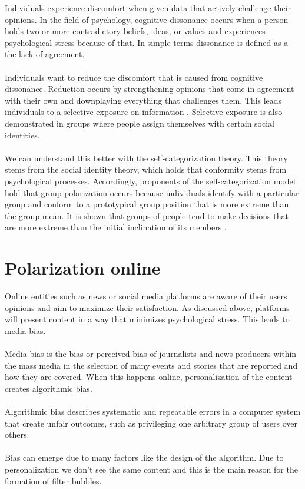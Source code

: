 Individuals experience discomfort when given data that actively challenge their opinions. In the field of psychology, cognitive dissonance occurs when a person holds two or more contradictory beliefs, ideas, or values and experiences psychological stress because of that. In simple terms dissonance is defined as a the lack of agreement.
\\
\\
Individuals want to reduce the discomfort that is caused from cognitive dissonance. Reduction occurs by strengthening opinions that come in agreement with their own and downplaying everything that challenges them. This leads individuals to a selective exposure on information \cite{jonasHardtFreyThelen2001}. Selective exposure is also demonstrated in groups where people assign themselves with certain social identities. 
\\
\\
We can understand this better with the self-categorization theory. This theory stems from the social identity theory, which holds that conformity stems from psychological processes. Accordingly, proponents of the self-categorization model hold that group polarization occurs because individuals identify with a particular group and conform to a prototypical group position that is more extreme than the group mean. It is shown that groups of people tend to make decisions that are more extreme than the initial inclination of its members \cite{sunstein}.

\label{sec:Structure}

\section{Polarization online}

Online entities such as news or social media platforms are aware of their users opinions  and aim to maximize their satisfaction. As discussed above, platforms will present content in a way that minimizes psychological stress. This leads to media bias. 
\\
\\
Media bias is the bias or perceived bias of journalists and news producers within the mass media in the selection of many events and stories that are reported and how they are covered. When this happens online, personalization of the content creates algorithmic bias. 
\\
\\
Algorithmic bias describes systematic and repeatable errors in a computer system that create unfair outcomes, such as privileging one arbitrary group of users over others. 
\\
\\
Bias can emerge due to many factors like the design of the algorithm. Due to personalization we don't see the same content and this is the main reason for the formation of filter bubbles.

